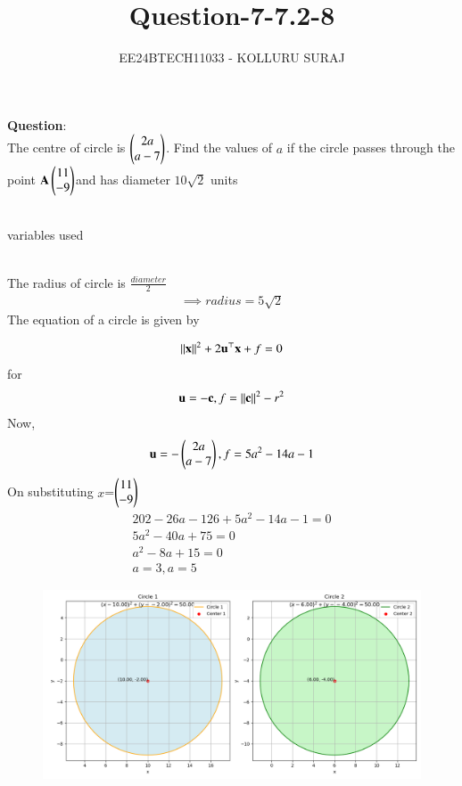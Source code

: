 \documentclass[journal]{IEEEtran}
\numberwithin{equation}{enumi}
\numberwithin{figure}{enumi}
\begin{document}

\title{Question-7-7.2-8}
\author{EE24BTECH11033 - KOLLURU SURAJ}
{\let\newpage\relax\maketitle}
\textbf{Question}:\\
The centre of circle is $\begin{pmatrix}2a\\a-7\end{pmatrix}$. Find the values of $a$ if the circle passes through the point $\mathbf{A}\begin{pmatrix}11\\-9\end{pmatrix}$and has diameter $10\sqrt{2}$ units 
\\
\solution \\
\begin{table}[!ht]
  \centering
  
  \caption{variables used}
\end{table}\\
The radius of circle is $\frac{diameter}{2}$
\begin{align}
    \implies radius=5\sqrt{2}
    \end{align}
     The equation of a circle is given by 
	
\begin{align}
	\left\lVert\mathbf{x}\right\rVert^2 + 2 \mathbf{u}^{\top}\mathbf{x} + f = 0
\end{align}
for
		\begin{align}
	 \mathbf{u}=-\mathbf{c}, f = \left\lVert\mathbf{c}\right\rVert^2-r^2
		\end{align}
  Now,
  \begin{align}
      \mathbf{u}=-\begin{pmatrix}2a\\a-7\end{pmatrix},f=5a^2-14a-1
  \end{align}
  On substituting $x$=$\begin{pmatrix}11\\-9\end{pmatrix}$
  \begin{align}
  202-26a-126+5a^2-14a-1=0\\
  5a^2-40a+75=0\\
  a^2-8a+15=0\\
  a=3,a=5
  \end{align}
  \begin{figure}[h!]
   \centering
   \includegraphics[width=0.7\linewidth]{figs/Figure_1.png}
   
   \label{stemplot}
\end{figure}
\end{document}

